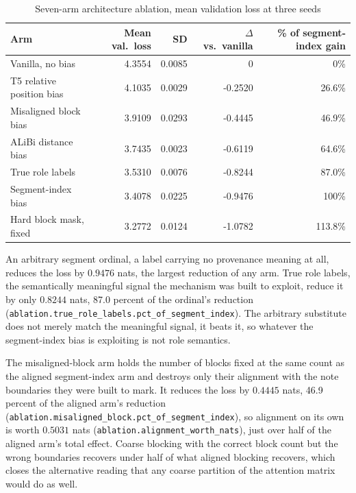 \begin{table}[H]
\caption{Seven-arm architecture ablation, mean validation loss at three seeds}
\label{tab:ablation}
\centering
\small
\begin{tabular}{lrrrr}
\toprule
\textbf{Arm} & \textbf{Mean val.\ loss} & \textbf{SD} & \textbf{$\Delta$ vs.\ vanilla} &
\textbf{\% of segment-index gain} \\
\midrule
Vanilla, no bias           & 4.3554 & 0.0085 & 0       & 0\% \\
T5 relative position bias  & 4.1035 & 0.0029 & -0.2520 & 26.6\% \\
Misaligned block bias      & 3.9109 & 0.0293 & -0.4445 & 46.9\% \\
ALiBi distance bias        & 3.7435 & 0.0023 & -0.6119 & 64.6\% \\
True role labels           & 3.5310 & 0.0076 & -0.8244 & 87.0\% \\
Segment-index bias         & 3.4078 & 0.0225 & -0.9476 & 100\% \\
Hard block mask, fixed     & 3.2772 & 0.0124 & -1.0782 & 113.8\% \\
\bottomrule
\end{tabular}
\end{table}

An arbitrary segment ordinal, a label carrying no provenance meaning at all, reduces the loss by
$0.9476$ nats, the largest reduction of any arm. True role labels, the semantically meaningful
signal the mechanism was built to exploit, reduce it by only $0.8244$ nats, 87.0 percent of the
ordinal's reduction (\texttt{ablation.true\_role\_labels.pct\_of\_segment\_index}). The arbitrary
substitute does not merely match the meaningful signal, it beats it, so whatever the segment-index
bias is exploiting is not role semantics.

The misaligned-block arm holds the number of blocks fixed at the same count as the aligned
segment-index arm and destroys only their alignment with the note boundaries they were built to
mark. It reduces the loss by $0.4445$ nats, 46.9 percent of the aligned arm's reduction
(\texttt{ablation.misaligned\_block.pct\_of\_segment\_index}), so alignment on its own is worth
$0.5031$ nats (\texttt{ablation.alignment\_worth\_nats}), just over half of the aligned arm's total
effect. Coarse blocking with the correct block count but the wrong boundaries recovers under half
of what aligned blocking recovers, which closes the alternative reading that any coarse partition of
the attention matrix would do as well.

